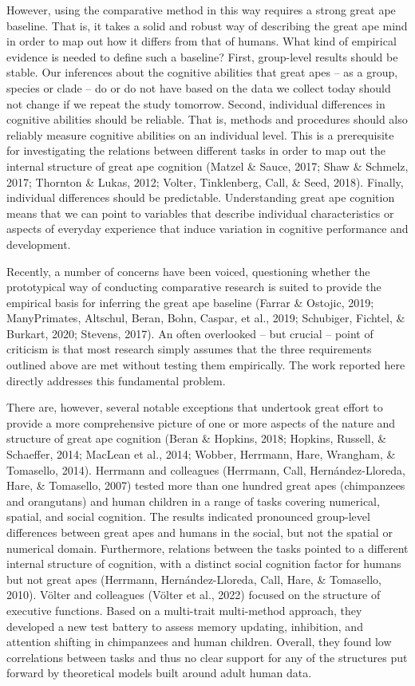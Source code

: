 \documentclass[
  man,floatsintext]{apa6}
\begin{document}
However, using the comparative method in this way requires a strong great ape baseline. That is, it takes a solid and robust way of describing the great ape mind in order to map out how it differs from that of humans. What kind of empirical evidence is needed to define such a baseline? First, group-level results should be stable. Our inferences about the cognitive abilities that great apes -- as a group, species or clade -- do or do not have based on the data we collect today should not change if we repeat the study tomorrow. Second, individual differences in cognitive abilities should be reliable. That is, methods and procedures should also reliably measure cognitive abilities on an individual level. This is a prerequisite for investigating the relations between different tasks in order to map out the internal structure of great ape cognition (Matzel \& Sauce, 2017; Shaw \& Schmelz, 2017; Thornton \& Lukas, 2012; Volter, Tinklenberg, Call, \& Seed, 2018). Finally, individual differences should be predictable. Understanding great ape cognition means that we can point to variables that describe individual characteristics or aspects of everyday experience that induce variation in cognitive performance and development.

Recently, a number of concerns have been voiced, questioning whether the prototypical way of conducting comparative research is suited to provide the empirical basis for inferring the great ape baseline (Farrar \& Ostojic, 2019; ManyPrimates, Altschul, Beran, Bohn, Caspar, et al., 2019; Schubiger, Fichtel, \& Burkart, 2020; Stevens, 2017). An often overlooked -- but crucial -- point of criticism is that most research simply assumes that the three requirements outlined above are met without testing them empirically. The work reported here directly addresses this fundamental problem.

There are, however, several notable exceptions that undertook great effort to provide a more comprehensive picture of one or more aspects of the nature and structure of great ape cognition (Beran \& Hopkins, 2018; Hopkins, Russell, \& Schaeffer, 2014; MacLean et al., 2014; Wobber, Herrmann, Hare, Wrangham, \& Tomasello, 2014). Herrmann and colleagues (Herrmann, Call, Hernández-Lloreda, Hare, \& Tomasello, 2007) tested more than one hundred great apes (chimpanzees and orangutans) and human children in a range of tasks covering numerical, spatial, and social cognition. The results indicated pronounced group-level differences between great apes and humans in the social, but not the spatial or numerical domain. Furthermore, relations between the tasks pointed to a different internal structure of cognition, with a distinct social cognition factor for humans but not great apes (Herrmann, Hernández-Lloreda, Call, Hare, \& Tomasello, 2010). Völter and colleagues (Völter et al., 2022) focused on the structure of executive functions. Based on a multi-trait multi-method approach, they developed a new test battery to assess memory updating, inhibition, and attention shifting in chimpanzees and human children. Overall, they found low correlations between tasks and thus no clear support for any of the structures put forward by theoretical models built around adult human data.
\end{document}
